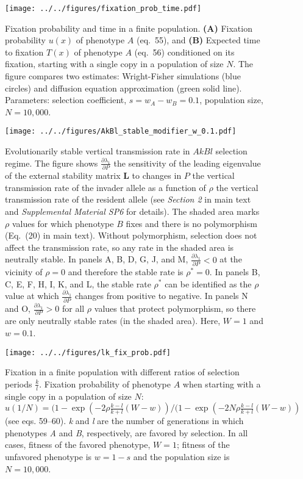 \documentclass[]{article}
\begin{document}
\begin{figure}
\centering
\texttt{[image: ../../figures/fixation\_prob\_time.pdf]}
\caption{Fixation probability and time in a finite population.
\textbf{(A)} Fixation probability \(u(x)\) of phenotype \(A\) (eq.\ 55), and \textbf{(B)}
Expected time to fixation \(T(x)\) of phenotype \(A\) (eq.\ 56) conditioned on its
fixation, starting with a single copy in a population of size \(N\). The
figure compares two estimates: Wright-Fisher simulations (blue circles) and diffusion
equation approximation (green solid line). Parameters: selection coefficient, \(s=w_A-w_B=0.1\),
population size, \(N=10,000\).}\label{fixation_prob_time}
\end{figure}

\begin{figure}
\centering
\texttt{[image: ../../figures/AkBl\_stable\_modifier\_w\_0.1.pdf]}
 \caption{Evolutionarily stable vertical transmission rate in $AkBl$ selection regime.
 The figure shows $\frac{\partial \lambda_1}{\partial P}$ the sensitivity of the leading eigenvalue of the external stability matrix $\mathbf{L}$ to changes in $P$ the vertical transmission rate of the invader allele as a function of $\rho$ the vertical transmission rate of the resident allele (see \emph{Section 2} in main text and \emph{Supplemental Material SP6} for details).
 The shaded area marks $\rho$ values for which phenotype $B$ fixes and there is no polymorphism (Eq.~(20) in main text).
 Without polymorphism, selection does not affect the transmission rate, so any rate in the shaded area is neutrally stable.
 In panels A, B, D, G, J, and M, $\frac{\partial \lambda_1}{\partial P} < 0$ at the vicinity of $\rho=0$ and therefore the stable rate is $\rho^*=0$.
 In panels B, C, E, F, H, I, K, and L, the stable rate $\rho^*$ can be identified as the $\rho$ value at which $\frac{\partial \lambda_1}{\partial P}$ changes from positive to negative.
 In panels N and O, $\frac{\partial \lambda_1}{\partial P} > 0$ for all $\rho$ values that protect polymorphism, so there are only neutrally stable rates (in the shaded area).
   Here, $W=1$ and $w=0.1$.}\label{fig:AkBl_stable_modifier_w_0.1}
\end{figure}

\begin{figure}
\centering
\texttt{[image: ../../figures/lk\_fix\_prob.pdf]}
\caption{Fixation in a finite population with different ratios of selection periods \(\frac{k}{l}\). Fixation probability of phenotype $A$ when starting with a single copy in a population of size $N$: $u(1/N) = (1-\exp(-2 \rho \frac{k-l}{k+l}(W-w))/(1-\exp(-2 N \rho \frac{k-l}{k+l}(W-w))$ (see eqs. 59--60).
\emph{k} and \emph{l} are the number of
generations in which phenotypes \emph{A} and \emph{B}, respectively, are favored by
selection. In all cases, fitness of the favored phenotype, $W = 1$; fitness of the unfavored phenotype is $w=1-s$ and the population size is \(N=10,000\).} \label{lk_fix_prob}
\end{figure}
\end{document}
